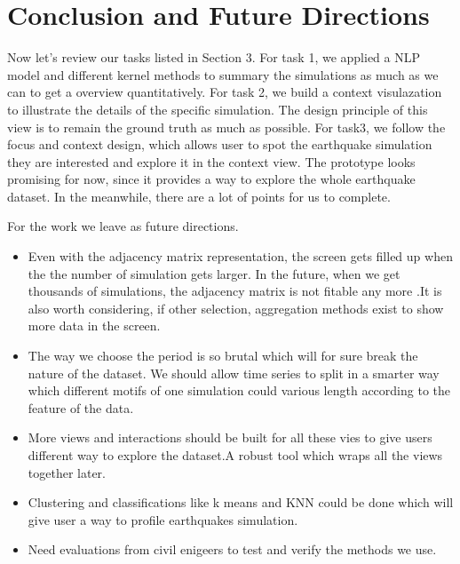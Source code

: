 \section{Conclusion and Future Directions}
\label{sec:conclusion}

Now let's review our tasks listed in Section 3. For task 1, we applied a NLP model and different kernel methods to summary the simulations as much as we can to get a overview quantitatively. For task 2, we build a context visulazation to illustrate the details of the specific simulation. The design principle of this view is to remain the ground truth as much as possible. For task3, we follow the focus and context design, which allows user to spot the earthquake simulation they are interested and explore it in the context view. The prototype looks promising for now, since it provides a way to explore the whole earthquake dataset. In the meanwhile, there are  a lot of points for us to complete.


For the work we leave as future directions.
\begin{itemize}
\item Even with the adjacency matrix representation, the screen gets filled up when the the number of simulation gets larger. In the future, when we get thousands of simulations, the adjacency matrix is not fitable any more .It is also worth considering, if other selection, aggregation methods exist to show more data in the screen.
\item The way we choose the period is so brutal which will for sure break the nature of the dataset. We should allow time series to split in a smarter way which different motifs of one simulation could various length according to the feature of the data.
\item More views and interactions should be built for all these vies to give users different way to explore the dataset.A robust tool which wraps all the views together later.
\item Clustering and classifications like k means and KNN could be done which will give user a way to profile earthquakes simulation. 
\item Need evaluations from civil enigeers to test and verify the methods we use. 
\end{itemize}

